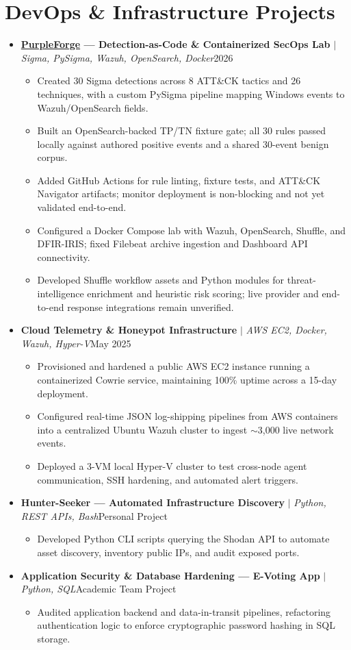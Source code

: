 \documentclass[letterpaper,10.5pt]{article}
\newcommand{\resumeItem}[1]{\item\small{#1\vspace{-1pt}}}
\newcommand{\resumeProjectHeading}[2]{\vspace{3pt}\item
  \small #1\hfill\small #2\vspace{-4pt}}
\newcommand{\resumeSubHeadingListStart}{\begin{itemize}[leftmargin=0.15in,label={}]}
\newcommand{\resumeSubHeadingListEnd}{\end{itemize}\vspace{-4pt}}
\newcommand{\resumeItemListStart}{\begin{itemize}[leftmargin=0.20in,itemsep=1pt,topsep=2pt]}
\newcommand{\resumeItemListEnd}{\end{itemize}\vspace{-3pt}}
\begin{document}
\section{DevOps \& Infrastructure Projects}
\resumeSubHeadingListStart
  \resumeProjectHeading{\textbf{\href{https://github.com/Moksha091/PurpleForge}{PurpleForge} --- Detection-as-Code \& Containerized SecOps Lab} $|$ \emph{Sigma, PySigma, Wazuh, OpenSearch, Docker}}{2026}
  \resumeItemListStart
    \resumeItem{Created 30 Sigma detections across 8 ATT\&CK tactics and 26 techniques, with a custom PySigma pipeline mapping Windows events to Wazuh/OpenSearch fields.}
    \resumeItem{Built an OpenSearch-backed TP/TN fixture gate; all 30 rules passed locally against authored positive events and a shared 30-event benign corpus.}
    \resumeItem{Added GitHub Actions for rule linting, fixture tests, and ATT\&CK Navigator artifacts; monitor deployment is non-blocking and not yet validated end-to-end.}
    \resumeItem{Configured a Docker Compose lab with Wazuh, OpenSearch, Shuffle, and DFIR-IRIS; fixed Filebeat archive ingestion and Dashboard API connectivity.}
    \resumeItem{Developed Shuffle workflow assets and Python modules for threat-intelligence enrichment and heuristic risk scoring; live provider and end-to-end response integrations remain unverified.}
  \resumeItemListEnd

  \resumeProjectHeading{\textbf{Cloud Telemetry \& Honeypot Infrastructure} $|$ \emph{AWS EC2, Docker, Wazuh, Hyper-V}}{May 2025}
  \resumeItemListStart
    \resumeItem{Provisioned and hardened a public AWS EC2 instance running a containerized Cowrie service, maintaining 100\% uptime across a 15-day deployment.}
    \resumeItem{Configured real-time JSON log-shipping pipelines from AWS containers into a centralized Ubuntu Wazuh cluster to ingest $\sim$3,000 live network events.}
    \resumeItem{Deployed a 3-VM local Hyper-V cluster to test cross-node agent communication, SSH hardening, and automated alert triggers.}
  \resumeItemListEnd

  \resumeProjectHeading{\textbf{Hunter-Seeker --- Automated Infrastructure Discovery} $|$ \emph{Python, REST APIs, Bash}}{Personal Project}
  \resumeItemListStart
    \resumeItem{Developed Python CLI scripts querying the Shodan API to automate asset discovery, inventory public IPs, and audit exposed ports.}
  \resumeItemListEnd

  \resumeProjectHeading{\textbf{Application Security \& Database Hardening --- E-Voting App} $|$ \emph{Python, SQL}}{Academic Team Project}
  \resumeItemListStart
    \resumeItem{Audited application backend and data-in-transit pipelines, refactoring authentication logic to enforce cryptographic password hashing in SQL storage.}
  \resumeItemListEnd
\resumeSubHeadingListEnd
\end{document}
